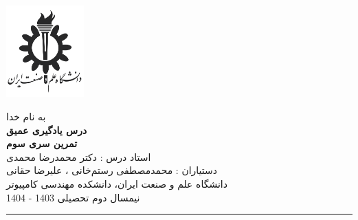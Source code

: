 \begin{minipage}{0.1\textwidth}
\includegraphics[width=3cm]{etc/IUST}
\end{minipage}%
\hfill%
\begin{minipage}{0.6\textwidth}\centering
\fontsize{13pt}{13pt}\selectfont
به‌ نام خدا \\
\textbf{درس یادگیری عمیق} \\
\textbf{تمرین سری سوم}\\
استاد درس : دکتر محمدرضا محمدی \\
دستیاران :  محمدمصطفی رستم‌خانی ، علیرضا حقانی\\
\vspace{0.25cm}
\begingroup
\fontsize{11pt}{11pt}\selectfont
دانشگاه علم و صنعت ایران، دانشکده مهندسی کامپیوتر \\
نیمسال دوم تحصیلی 1403 - 1404 \\
\endgroup
\end{minipage}
\hfill
\begin{minipage}{0.1\textwidth}

\end{minipage}

\vspace{0.5cm}

\noindent\rule{\textwidth}{1pt}